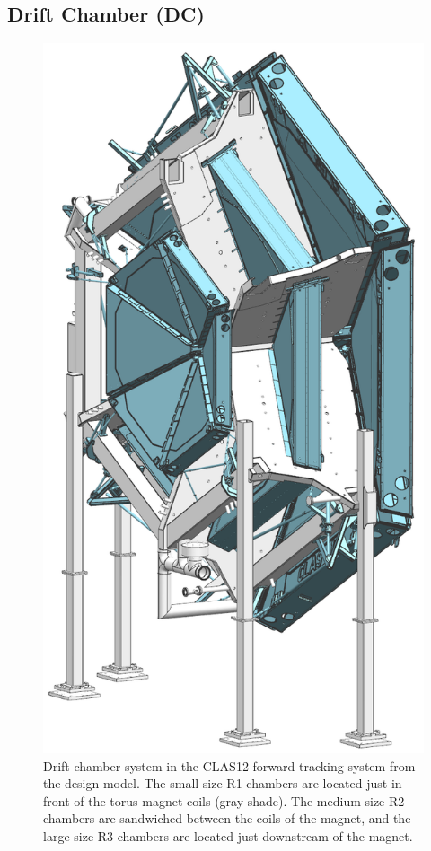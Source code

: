 \documentclass[final,3p,twocolumn]{elsarticle}
\begin{document}
\subsection{Drift Chamber (DC)}
\begin{figure}[ht!]
\centerline{\includegraphics[width=0.60\columnwidth]{dc-view-4.png}}
\caption{Drift chamber system in the CLAS12 forward tracking system from the design model. The small-size R1
  chambers are located just in front of the torus magnet coils (gray shade). The medium-size R2 chambers are
  sandwiched between the coils of the magnet, and the large-size R3 chambers are located just downstream of the
  magnet.}
\label{clas12-dc}
\end{figure}
\end{document}
